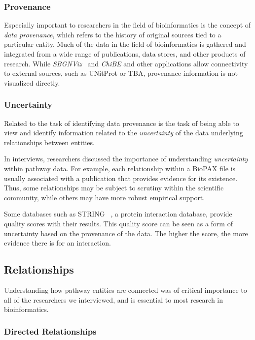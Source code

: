 \documentclass[journal]{vgtc}                %
\begin{document}
\subsubsection{Provenance}

Especially important to researchers in the field of bioinformatics is the concept of \textit{data provenance}, which refers to the history of original sources tied to a particular entity. Much of the data in the field of bioinformatics is gathered and integrated from a wide range of publications, data stores, and other products of research.
While \textit{SBGNViz}~\cite{SBGNViz2015} and \textit{ChiBE}\cite{Babur2010chibe} and other applications allow connectivity to external sources, such as UNitProt or TBA, provenance information is not visualized directly.

\subsubsection{Uncertainty}

Related to the task of identifying data provenance is the task of being able to view and identify information related to the \textit{uncertainty} of the data underlying relationships between entities.

In interviews, researchers discussed the importance of understanding \emph{uncertainty} within pathway data. For example, each relationship within a BioPAX file is usually associated with a publication that provides evidence for its existence. Thus, some relationships may be subject to scrutiny within the scientific community, while others may have more robust empirical support.

Some databases such as STRING~\cite{STRING2005} , a protein interaction database, provide quality scores with their results. This quality score can be seen as a form of uncertainty based on the provenance of the data.
The higher the score, the more evidence there is for an interaction.

\subsection{Relationships}

Understanding how pathway entities are connected was of critical importance to all of the researchers we interviewed, and is essential to most research in bioinformatics.

\subsubsection{Directed Relationships}
\end{document}
